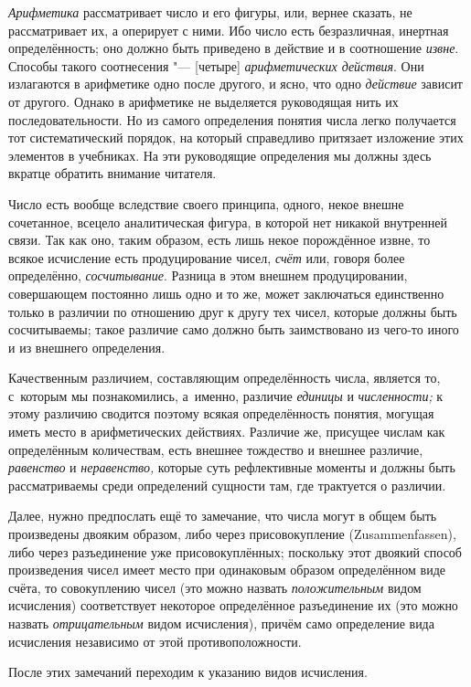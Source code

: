 {\em Арифметика} рассматривает число и его фигуры, или, вернее сказать, не
рассматривает их, а оперирует с ними. Ибо число есть безразличная, инертная
определённость; оно должно быть приведено в действие и в соотношение
{\em извне}. Способы такого соотнесения "--- [четыре] {\em арифметических действия}.
Они излагаются в арифметике одно после другого, и ясно, что одно {\em действие}
зависит от другого. Однако в арифметике не выделяется руководящая нить их
последовательности. Но из самого определения понятия числа легко получается тот
систематический порядок, на который справедливо притязает изложение этих
элементов в учебниках. На эти руководящие определения мы должны здесь вкратце
обратить внимание читателя.

Число есть вообще вследствие своего принципа, одного, некое внешне сочетанное,
всецело аналитическая фигура, в которой нет никакой внутренней связи. Так как
оно, таким образом, есть лишь некое порождённое извне, то всякое исчисление
есть продуцирование чисел, {\em счёт} или, говоря более определённо,
{\em сосчитывание}. Разница в этом внешнем продуцировании, совершающем
постоянно лишь одно и то же, может заключаться единственно только в различии по
отношению друг к другу тех чисел, которые должны быть сосчитываемы; такое
различие само должно быть заимствовано из чего-то иного и из внешнего
определения.

Качественным различием, составляющим определённость числа, является то,
с~которым мы познакомились, а~именно, различие {\em единицы} и {\em численности;}
к этому различию сводится поэтому всякая определённость понятия, могущая иметь
место в арифметических действиях. Различие же, присущее числам как определённым
количествам, есть внешнее тождество и внешнее различие, {\em равенство} и
{\em неравенство,} которые суть рефлективные моменты и должны быть
рассматриваемы среди определений сущности там, где трактуется о различии.

Далее, нужно предпослать ещё то замечание, что числа могут в общем быть
произведены двояким образом, либо через присовокупление
(Zu\-sam\-men\-fas\-sen), либо через разъединение уже присовокуплённых;
поскольку этот двоякий способ произведения чисел имеет место при одинаковым
образом определённом виде счёта, то совокуплению чисел (это можно назвать
{\em положительным} видом исчисления) соответствует некоторое определённое
разъединение их (это можно назвать {\em отрицательным} видом исчисления),
причём само определение вида исчисления независимо от этой противоположности.

После этих замечаний переходим к указанию видов исчисления.

